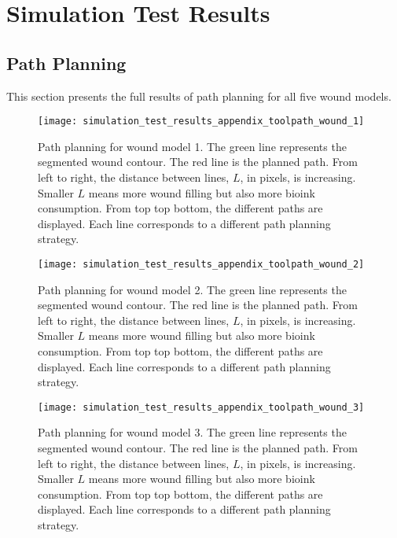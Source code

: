\chapter{Simulation Test Results}
\label{app:simulation_test_results}

\section{Path Planning}
\label{sec:simulation_test_results_appendix_path_planning}

This section presents the full results of path planning for all five wound models.

\begin{figure}[htbp]
	\centering
	\texttt{[image: simulation\_test\_results\_appendix\_toolpath\_wound\_1]}
	\caption[Path planning for wound model 1.]{Path planning for wound model 1. The green line represents the segmented wound contour. The red line is the planned path. From left to right, the distance between lines, $L$, in pixels, is increasing. Smaller $L$ means more wound filling but also more bioink consumption. From top top bottom, the different paths are displayed. Each line corresponds to a different path planning strategy.}
	\label{fig:simulation_test_results_appendix_toolpath_wound_1}
\end{figure}

\begin{figure}[htbp]
	\centering
	\texttt{[image: simulation\_test\_results\_appendix\_toolpath\_wound\_2]}
	\caption[Path planning for wound model 2.]{Path planning for wound model 2. The green line represents the segmented wound contour. The red line is the planned path. From left to right, the distance between lines, $L$, in pixels, is increasing. Smaller $L$ means more wound filling but also more bioink consumption. From top top bottom, the different paths are displayed. Each line corresponds to a different path planning strategy.}
	\label{fig:simulation_test_results_appendix_toolpath_wound_2}
\end{figure}

\begin{figure}[htbp]
	\centering
	\texttt{[image: simulation\_test\_results\_appendix\_toolpath\_wound\_3]}
	\caption[Path planning for wound model 3.]{Path planning for wound model 3. The green line represents the segmented wound contour. The red line is the planned path. From left to right, the distance between lines, $L$, in pixels, is increasing. Smaller $L$ means more wound filling but also more bioink consumption. From top top bottom, the different paths are displayed. Each line corresponds to a different path planning strategy.}
	\label{fig:simulation_test_results_appendix_toolpath_wound_3}
\end{figure}

